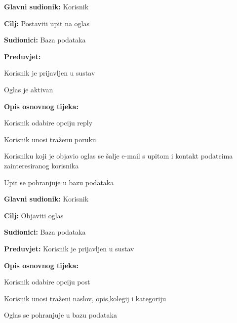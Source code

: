 					\noindent {}
					\begin{packed_item}
	
						\item \textbf{Glavni sudionik: } Korisnik
						\item  \textbf{Cilj:} Postaviti upit na oglas
						\item  \textbf{Sudionici:} Baza podataka
						\item  \textbf{Preduvjet:} 
						    \begin{packed_enum}
	
							\item Korisnik je prijavljen u sustav
							\item Oglas je aktivan
						    \end{packed_enum}
						\item  \textbf{Opis osnovnog tijeka:}
						
						\item[] \begin{packed_enum}
	
							\item Korisnik odabire opciju reply
							\item Korisnik unosi traženu poruku
							\item Korisniku koji je objavio oglas se šalje e-mail s upitom i kontakt podatcima zainteresiranog korisnika
							\item Upit se pohranjuje u bazu podataka
						\end{packed_enum}
						
					
					\end{packed_item}
					
					\noindent \underbar{\textbf{UC7 -Post oglas}}
					\begin{packed_item}
	
						\item \textbf{Glavni sudionik: } Korisnik
						\item  \textbf{Cilj:} Objaviti oglas
						\item  \textbf{Sudionici:} Baza podataka
						\item  \textbf{Preduvjet:} Korisnik je prijavljen u sustav

						\item  \textbf{Opis osnovnog tijeka:}
						
						\item[] \begin{packed_enum}
	
							\item Korisnik odabire opciju post 
							\item Korisnik unosi traženi naslov, opis,kolegij i kategoriju
							\item Oglas se pohranjuje u bazu podataka
						\end{packed_enum}
						
					
					\end{packed_item}
					
